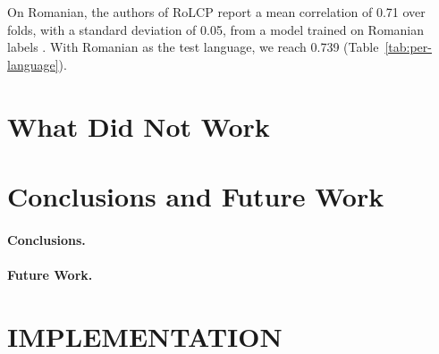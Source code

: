On Romanian, the authors of RoLCP report a mean correlation of 0.71 over folds, with a standard %
deviation of 0.05, from a model trained on Romanian labels \citep{anghel-etal-2025-rals}. With Romanian as the
test language, we reach 0.739 (Table~\ref{tab:per-language}). %

\section{What Did Not Work}
\label{sec:negative}

\section{Conclusions and Future Work}
\label{sec:conclusions}

\paragraph{Conclusions.}

\paragraph{Future Work.}

\section*{\uppercase{Implementation}}

